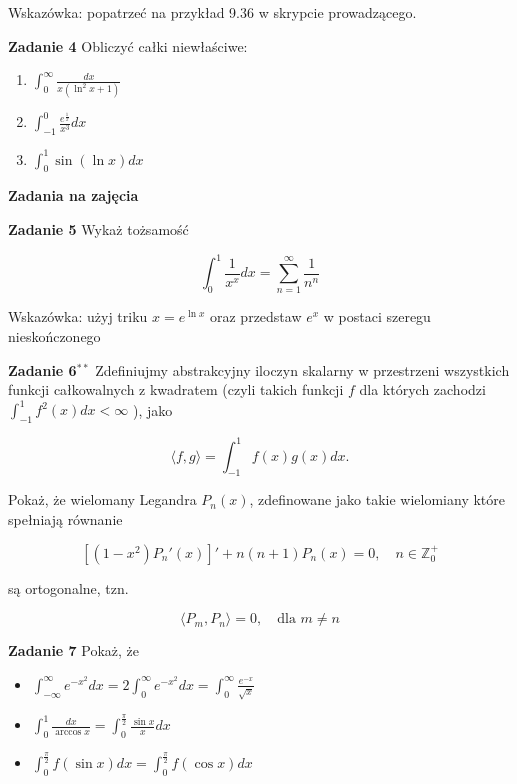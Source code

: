 \documentclass[a4paper,11pt]{article}
\begin{document}
Wskazówka: popatrzeć na przykład 9.36 w skrypcie prowadzącego.
\bigskip

\textbf{Zadanie 4} Obliczyć całki niewłaściwe:

\begin{multicols}{3}
    \begin{enumerate}
        \item $ \int_{0}^\infty \frac{dx}{x(\ln^2 x + 1)}$
        \item $\int_{-1}^{0} \frac{e^{\frac{1}{x}}}{x^3} dx$
        \item $\int_{0}^{1} \sin(\ln x) dx$
    \end{enumerate}
\end{multicols}

\bigskip

\hrulefill

\begin{center}
    \textbf{Zadania na zajęcia}
\end{center}

\bigskip

\textbf{Zadanie 5} Wykaż tożsamość

$$\int_{0}^{1} \frac{1}{x^x} dx = \sum_{n=1}^{\infty} \frac{1}{n^n}$$

Wskazówka: użyj triku $x = e^{\ln x}$ oraz przedstaw $e^x$ w postaci
szeregu nieskończonego

\bigskip

\textbf{Zadanie 6$^{\ast\ast}$} Zdefiniujmy abstrakcyjny iloczyn skalarny
w przestrzeni wszystkich funkcji całkowalnych z kwadratem (czyli takich
funkcji $f$ dla których zachodzi $\int_{-1}^1 f^2(x) dx < \infty$ ), jako 

$$ \langle f,g\rangle = \int_{-1}^1 f(x) g(x) dx.$$

Pokaż, że wielomany Legandra $P_n(x)$, zdefinowane jako takie wielomiany
które spełniają równanie

$$[(1-x^2)P_n'(x)]' + n(n+1) P_n(x) = 0, \quad n \in \mathbb{Z}_0^{+}$$

są ortogonalne, tzn. 

$$\langle P_m, P_n \rangle = 0, \quad \text{dla~} m \neq n$$

\bigskip

\textbf{Zadanie 7} Pokaż, że 
\begin{itemize}
    \item $\int^\infty_{-\infty} e^{-x^2} dx = 2 \int_{0}^\infty
        e^{-x^2} dx = \int_{0}^\infty \frac{e^{-x}}{\sqrt{x} }$
    \item $\int_{0}^1 \frac{dx}{\arccos x} = \int_{0}^{\frac{\pi}{2}}
        \frac{\sin x}{x} dx$
    \item $\int_{0}^{\frac{\pi}{2}} f(\sin x) dx =
        \int_{0}^{\frac{\pi}{2}} f(\cos x) dx$
\end{itemize}
\end{document}
